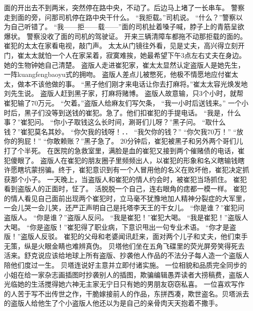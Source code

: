 \documentclass[a4paper,12pt,UTF8,twoside]{ctexbook}
\begin{document}
        面的开出去不到两米，突然停在路中央，不动了。后边马上堵了一长串车。  
        警察走到面的旁，问那司机停在路中央干什么。  
        “我拒载。”司机说。  
        “什么？”警察以为自己听错了。  
        “我——拒——载——”面的司机扯着嗓子喊，脖子上的青筋呈欲爆状。  
        警察没收了面的司机的驾驶证。  
        开来三辆清障车都拖不动那拒载的面的。  
        崔犯的太太在家看电视，敲门声。  
        太太从门镜往外看，见是丈夫，高兴得立刻开门，崔太太就怕一个人在家呆着，寂寞难挨，她最希望下午3点左右丈夫在身边。她的生物钟她自己清楚。  
        盗版人走进崔犯家，崔太太显然认定盗版人是她先生，一阵kuangfengbaoyu式的拥吻。  
        盗版人差点儿被憋死，他极不情愿地应付崔太太，做本不该他做的事。  
        “黑子他们刚才来电话让你去打麻将。”崔太太容光焕发地刘先生说。  
        盗版人赶到黑子家，打麻将赌博。  
        盗版人故意输，只3个小时，就帮崔犯输了70万元。  
        “欠着。”盗版人给麻友们写欠条，  “我一小时后送钱来。”  
        一个小时后，黑子们没等到送钱的崔犯。急了。他们扣崔犯的手提电话。  
        “我是，什么事？”崔犯问。  
        “你小子取钱这么长时间，涮哥们儿呀？”黑子问。  
        “取什么钱？”崔犯莫名其妙。  
        “你欠我的钱呀！．．  
        “我欠你的钱？”  
        “你欠我70万！”  
        “放你的狗屁！”  
        “你敢赖账？”黑子急了。  
        20分钟后，崔犯被黑子和另外两个哥们儿打了个半死。  
        在医院的急救室里，满脸是血的崔犯又接到两个催赌债的电话，崔犯傻眼了。  
        盗版人在崔犯的朋友圈子里频频出人，以崔犯的形象和名义瞎输钱瞎许愿瞎坑蒙拐骗。终于，崔犯意识到有一个人冒用他的名义在败坏他，崔犯决定抓获那个小子。  
        一天晚上，当盗版人和崔犯的情人约会时，被崔犯当场抓住。  
        崔犯看到盗版人的正面时，怔了。        
        活脱脱一个自己，连右眼角的痣都一模一样。  
        崔犯的情人看见自己面前出现两个崔犯时，立马毫不犹豫地加人精神分裂症的大军里，一会儿哭一会儿笑，还严正声明自己是托塔李天王的干女儿。  
        “你是谁？”崔犯问盗版人。  
        “你是谁？”盗版人反问。  
        “我是崔犯！”崔犯大喝。  
        “我是崔犯！”盗版人大喝。  
        “你是盗版！”崔犯得了职业病，下意识甩出一句专业术语。  
        “你才是盗版！”盗版人反驳。  
        崔犯的父母和老婆闻讯赶来，面对两个儿子和丈夫，他们束手无策，纵是火眼金睛也难辨真伪。  
        贝塔他们坐在五角飞碟里的荧光屏旁笑得死去活来。舒克说应该给地球上所有盗版、抄袭他人作品的不法分子每人造一个盗版人陪他们度过一生。  
        贝塔连说好主意并立即付诸实施。  
        一位相貌和品质完全同步的小姐在给一家杂志画插图时抄袭别人的插图，欺骗编辑愚弄读者大捞稿费，盗版人光临她的生活搅得她六神无主家无宁日只有她的男朋友窃窃私喜。  
        一位喜欢写作的人苦于写不出传世之作，干脆嫁接前人的作品，东拼西凑，欺世盗名。贝塔派去的盗版人给他生了个小盗版人他还以为是自己的亲骨肉天天抱着不撒手。  
\end{document}
